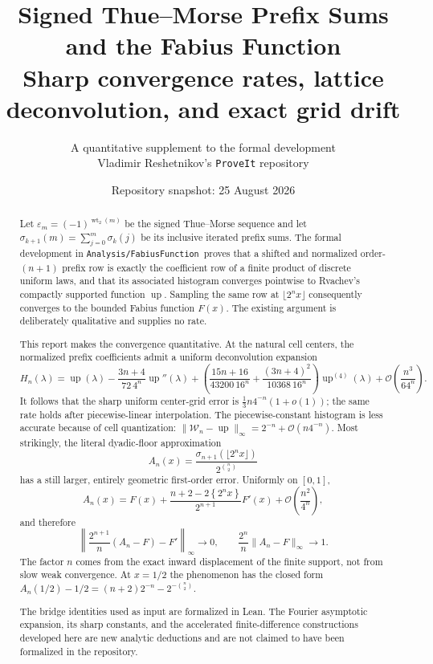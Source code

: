 \documentclass[11pt,oneside]{article}
\title{\bfseries Signed Thue--Morse Prefix Sums and the Fabius Function\\[0.35em]
\large Sharp convergence rates, lattice deconvolution, and exact grid drift}
\author{A quantitative supplement to the formal development\\
\small Vladimir Reshetnikov's \texttt{ProveIt} repository}
\date{Repository snapshot: 25 August 2026}
\theoremstyle{definition}
\theoremstyle{remark}
\newcommand{\Up}{\operatorname{up}}
\newcommand{\wt}{\operatorname{wt}_2}
\newcommand{\bigO}{\mathcal O}
\newcommand{\repo}{\nolinkurl{Analysis/FabiusFunction}}
\newcommand{\fract}[1]{\left\{#1\right\}}
\begin{document}
\maketitle

\begin{abstract}
Let $\varepsilon_m=(-1)^{\wt(m)}$ be the signed Thue--Morse sequence and let
$\sigma_{k+1}(m)=\sum_{j=0}^{m}\sigma_k(j)$ be its inclusive iterated prefix sums.  The
formal development in \repo\ proves that a shifted and normalized order-$(n+1)$ prefix row
is exactly the coefficient row of a finite product of discrete uniform laws, and that its
associated histogram converges pointwise to Rvachev's compactly supported function $\Up$.
Sampling the same row at $\lfloor 2^n x\rfloor$ consequently converges to the bounded Fabius
function $F(x)$.  The existing argument is deliberately qualitative and supplies no rate.

This report makes the convergence quantitative.  At the natural cell centers, the normalized
prefix coefficients admit a uniform deconvolution expansion
\[
 H_n(\lambda)=\Up(\lambda)
 -\frac{3n+4}{72\,4^n}\Up''(\lambda)
 +\left(\frac{15n+16}{43200\,16^n}
       +\frac{(3n+4)^2}{10368\,16^n}\right)\Up^{(4)}(\lambda)
 +\bigO\!\left(\frac{n^3}{64^n}\right).
\]
It follows that the sharp uniform center-grid error is
$\frac13 n4^{-n}(1+o(1))$; the same rate holds after piecewise-linear interpolation.
The piecewise-constant histogram is less accurate because of cell quantization:
$\|\mathcal W_n-\Up\|_\infty=2^{-n}+\bigO(n4^{-n})$.
Most strikingly, the literal dyadic-floor approximation
\[
 A_n(x)=\frac{\sigma_{n+1}(\lfloor2^n x\rfloor)}{2^{\binom n2}}
\]
has a still larger, entirely geometric first-order error.  Uniformly on $[0,1]$,
\[
 A_n(x)=F(x)+\frac{n+2-2\fract{2^nx}}{2^{n+1}}F'(x)
          +\bigO\!\left(\frac{n^2}{4^n}\right),
\]
and therefore
\[
 \left\|\frac{2^{n+1}}n(A_n-F)-F'\right\|_\infty\longrightarrow0,
 \qquad
 \frac{2^n}{n}\|A_n-F\|_\infty\longrightarrow1.
\]
The factor $n$ comes from the exact inward displacement of the finite support, not from slow
weak convergence.  At $x=1/2$ the phenomenon has the closed form
$A_n(1/2)-1/2=(n+2)2^{-n}-2^{-\binom n2}$.

The bridge identities used as input are formalized in Lean.  The Fourier asymptotic expansion,
its sharp constants, and the accelerated finite-difference constructions developed here are
new analytic deductions and are not claimed to have been formalized in the repository.
\end{abstract}
\end{document}
